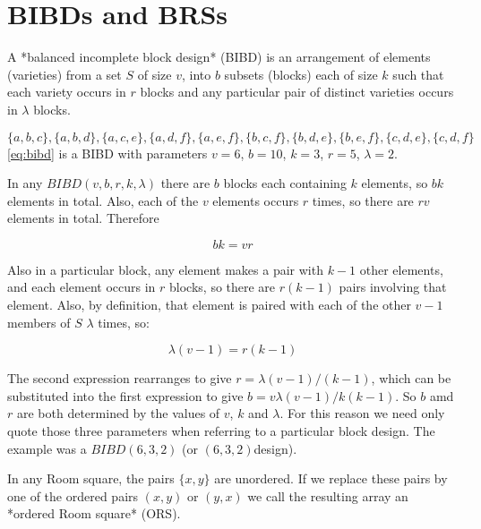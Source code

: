 \documentclass[11pt, a4paper]{book}\usepackage[]{graphicx}\usepackage[]{xcolor}
\newcounter{example}
\begin{document}
\section{BIBDs and BRSs}

A *balanced incomplete block design* (BIBD) is an
arrangement of elements (varieties) from a set $S$ of size
$v$, into $b$ subsets (blocks) each of size $k$ such that
each variety occurs in $r$ blocks and any particular pair of
distinct varieties occurs in $\lambda$ blocks.

\begin{example}
\begin{equation}
\label{eq:bibd}
\{a,b,c\},\{a,b,d\},\{a,c,e\},\{a,d,f\},\{a,e,f\},\{b,c,f\},\{b,d,e\},\{b,e,f\},\{c,d,e\},\{c,d,f\}
\end{equation}
\eqref{eq:bibd} is a BIBD with parameters $v = 6$, $b = 10$, $k = 3$,
$r = 5$, $\lambda = 2$.
\end{example}

In any $BIBD(v, b, r, k, \lambda)$ there are $b$ blocks each
containing $k$ elements, so $bk$ elements in total. Also,
each of the $v$ elements occurs $r$ times, so there are $rv$
elements in total. Therefore

\begin{equation}
bk = vr
\end{equation}

Also in a
particular block, any element makes a pair with $k - 1$
other elements, and each element occurs in $r$ blocks, so
there are $r(k - 1)$ pairs involving that element. Also, by
definition, that element is paired with each of the other
$v - 1$ members of $S$ $\lambda$ times, so:

\begin{equation}
\lambda (v - 1) = r(k - 1)
\end{equation}

The second expression rearranges to give
$r = \lambda (v - 1)/(k - 1)$, which can be substituted
into the first expression to give
$b = v\lambda (v - 1)/k(k - 1)$. So $b$ amd $r$ are
both determined by the values of $v$, $k$ and $\lambda$. For
this reason we need only quote those three parameters when
referring to a particular block design. The example was a
$BIBD(6, 3, 2)$ (or $(6, 3, 2)$design).

In any Room square, the pairs $\{x, y\}$ are unordered. If we
replace these pairs by one of the ordered pairs $(x, y)$ or
$(y, x)$ we call the resulting array an
*ordered Room square* (ORS).
\end{document}
